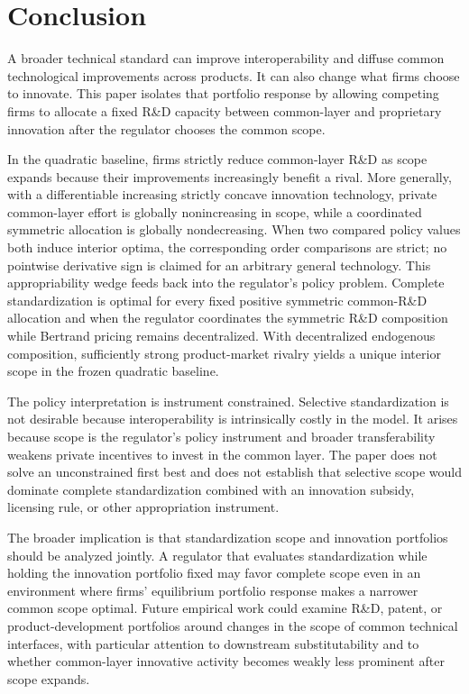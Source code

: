 \section{Conclusion}

A broader technical standard can improve interoperability and diffuse common technological improvements across products. It can also change what firms choose to innovate. This paper isolates that portfolio response by allowing competing firms to allocate a fixed R\&D capacity between common-layer and proprietary innovation after the regulator chooses the common scope.

In the quadratic baseline, firms strictly reduce common-layer R\&D as scope expands because their improvements increasingly benefit a rival. More generally, with a differentiable increasing strictly concave innovation technology, private common-layer effort is globally nonincreasing in scope, while a coordinated symmetric allocation is globally nondecreasing. When two compared policy values both induce interior optima, the corresponding order comparisons are strict; no pointwise derivative sign is claimed for an arbitrary general technology. This appropriability wedge feeds back into the regulator's policy problem. Complete standardization is optimal for every fixed positive symmetric common-R\&D allocation and when the regulator coordinates the symmetric R\&D composition while Bertrand pricing remains decentralized. With decentralized endogenous composition, sufficiently strong product-market rivalry yields a unique interior scope in the frozen quadratic baseline.

The policy interpretation is instrument constrained. Selective standardization is not desirable because interoperability is intrinsically costly in the model. It arises because scope is the regulator's policy instrument and broader transferability weakens private incentives to invest in the common layer. The paper does not solve an unconstrained first best and does not establish that selective scope would dominate complete standardization combined with an innovation subsidy, licensing rule, or other appropriation instrument.

The broader implication is that standardization scope and innovation portfolios should be analyzed jointly. A regulator that evaluates standardization while holding the innovation portfolio fixed may favor complete scope even in an environment where firms' equilibrium portfolio response makes a narrower common scope optimal. Future empirical work could examine R\&D, patent, or product-development portfolios around changes in the scope of common technical interfaces, with particular attention to downstream substitutability and to whether common-layer innovative activity becomes weakly less prominent after scope expands.
